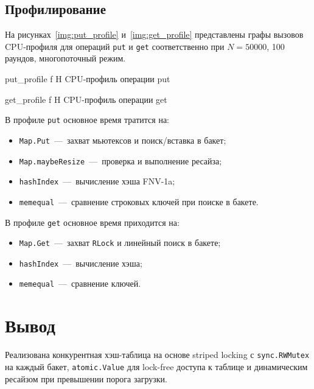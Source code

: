 \documentclass{itmo}
\begin{document}
\section{Профилирование}

На рисунках~\ref{img:put_profile} и~\ref{img:get_profile} представлены графы вызовов CPU-профиля для операций \texttt{put} и \texttt{get} соответственно при $N = 50000$, 100 раундов, многопоточный режим.

	{put_profile}
	{f}
	{H}
	{\textwidth}
	{CPU-профиль операции put}

	{get_profile}
	{f}
	{H}
	{\textwidth}
	{CPU-профиль операции get}

В профиле \texttt{put} основное время тратится на:
\begin{itemize}
	\item \texttt{Map.Put}~---~захват мьютексов и поиск/вставка в бакет;
	\item \texttt{Map.maybeResize}~---~проверка и выполнение ресайза;
	\item \texttt{hashIndex}~---~вычисление хэша FNV-1a;
	\item \texttt{memequal}~---~сравнение строковых ключей при поиске в бакете.
\end{itemize}

В профиле \texttt{get} основное время приходится на:
\begin{itemize}
	\item \texttt{Map.Get}~---~захват \texttt{RLock} и линейный поиск в бакете;
	\item \texttt{hashIndex}~---~вычисление хэша;
	\item \texttt{memequal}~---~сравнение ключей.
\end{itemize}

\chapter{Вывод}

Реализована конкурентная хэш-таблица на основе striped locking с \texttt{sync.RWMutex} на каждый бакет, \texttt{atomic.Value} для lock-free доступа к таблице и динамическим ресайзом при превышении порога загрузки.
\end{document}
